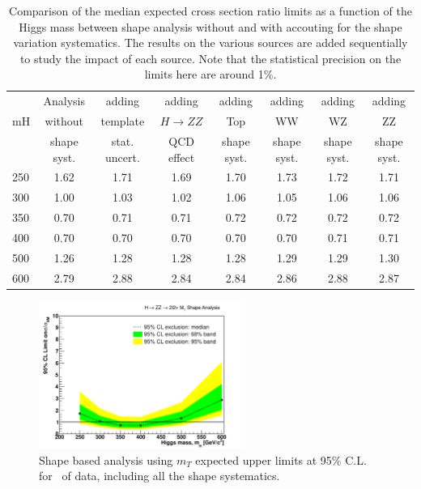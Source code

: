 \begin{table}[!ht]
\begin{center}
{\normalsize
\begin{tabular}{|l|c|cccccc|}
\hline
      &  Analysis    & adding          &  adding      &  adding      &  adding      & adding      & adding \\
mH  &  without     & template        &  $H\to ZZ$   &  Top         &  WW          & WZ          & ZZ \\
      &  shape syst. & stat. uncert.   &  QCD effect &  shape syst. &  shape syst. & shape syst. & shape syst. \\
\hline
250 & 1.62 & 1.71 & 1.69 & 1.70 & 1.73 & 1.72 & 1.71 \\   
300 & 1.00 & 1.03 & 1.02 & 1.06 & 1.05 & 1.06 & 1.06 \\ 
350 & 0.70 & 0.71 & 0.71 & 0.72 & 0.72 & 0.72 & 0.72 \\
400 & 0.70 & 0.70 & 0.70 & 0.70 & 0.70 & 0.71 & 0.71 \\
500 & 1.26 & 1.28 & 1.28 & 1.28 & 1.29 & 1.29 & 1.30 \\
600 & 2.79 & 2.88 & 2.84 & 2.84 & 2.86 & 2.88 & 2.87 \\
\hline
\end{tabular}
}
\caption{Comparison of the median expected cross section ratio limits as a function 
of the Higgs mass between shape analysis without and with accouting for the 
shape variation systematics. The results on the various sources are added sequentially 
to study the impact of each source. Note that the statistical precision on the limits 
here are around 1\%. }
\label{tab:mva_mtshape_detail}
\end{center}
\end{table}

\begin{figure}[!htbp]
\begin{center}
   \includegraphics[width=0.6\textwidth]{figures/limits_mtshape_4fb.pdf}
   \caption{Shape based analysis using $m_T$ expected upper limits at 95\% C.L. for \intlumi\ of data, including all the shape systematics.}
   \label{fig:limits_mtshape_4fb}
\end{center}
\end{figure}

